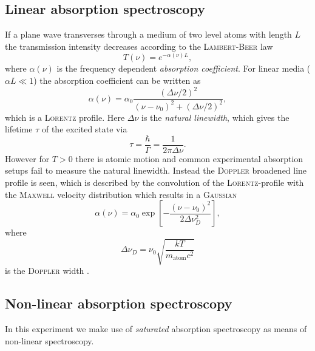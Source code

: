 \documentclass[11pt,a4paper,notitlepage]{scrartcl}
\begin{document}
\subsection{Linear absorption spectroscopy}
If a plane wave transverses through a medium of two level atoms with length $L$ the transmission intensity decreases according to the \textsc{Lambert-Beer} law \cite{manual} \begin{equation}
	T(\nu)=e^{-\alpha(\nu)L},
	\label{eq:beer}
\end{equation}
where $\alpha(\nu)$ is the frequency dependent \emph{absorption coefficient}. For linear media ($\alpha L\ll 1$) the absorption coefficient can be written as \cite{manual} \begin{equation}
	\label{eq:lorentz}
\alpha(\nu)=\alpha_0\frac{(\Delta\nu/2)^2}{(\nu-\nu_0)^2+(\Delta\nu/2)^2},
\end{equation}
which is a \textsc{Lorentz} profile. Here $\Delta\nu$ is the \emph{natural linewidth}, which gives the lifetime $\tau$ of the excited state via \cite{manual} \begin{equation}
	\label{eq:lifetime}
	\tau=\frac{\hbar}{\Gamma}=\frac{1}{2\pi\Delta\nu}.
\end{equation}
However for $T>0$ there is atomic motion and common experimental absorption setups fail to measure the natural linewidth. Instead the \textsc{Doppler} broadened line profile is seen, which is described by the convolution of the \textsc{Lorentz}-profile with the \textsc{Maxwell} velocity distribution which results in a \textsc{Gaussian} \begin{equation}\label{eq:dopp}
	\alpha(\nu)=\alpha_0\exp\left[-\frac{(\nu-\nu_0)^2}{2\Delta\nu_D^2}\right],
\end{equation}
where $$\Delta\nu_D=\nu_0\sqrt{\frac{kT}{m_{\text{atom}}c^2}}$$ is the \textsc{Doppler} width \cite{manual}.
\subsection{Non-linear absorption spectroscopy}
In this experiment we make use of \emph{saturated} absorption spectroscopy as means of non-linear spectroscopy.
\end{document}
